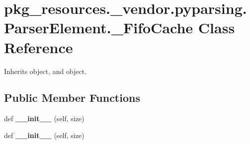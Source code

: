 \hypertarget{classpkg__resources_1_1__vendor_1_1pyparsing_1_1_parser_element_1_1___fifo_cache}{}\section{pkg\+\_\+resources.\+\_\+vendor.\+pyparsing.\+Parser\+Element.\+\_\+\+Fifo\+Cache Class Reference}
\label{classpkg__resources_1_1__vendor_1_1pyparsing_1_1_parser_element_1_1___fifo_cache}


Inherits object, and object.

\subsection*{Public Member Functions}
\begin{DoxyCompactItemize}
\item 
\mbox{\label{classpkg__resources_1_1__vendor_1_1pyparsing_1_1_parser_element_1_1___fifo_cache_aca145468719a3d094755abed267cb98b}} 
def {\bfseries \+\_\+\+\_\+init\+\_\+\+\_\+} (self, size)
\item 
\mbox{\label{classpkg__resources_1_1__vendor_1_1pyparsing_1_1_parser_element_1_1___fifo_cache_aca145468719a3d094755abed267cb98b}} 
def {\bfseries \+\_\+\+\_\+init\+\_\+\+\_\+} (self, size)
\end{DoxyCompactItemize}

